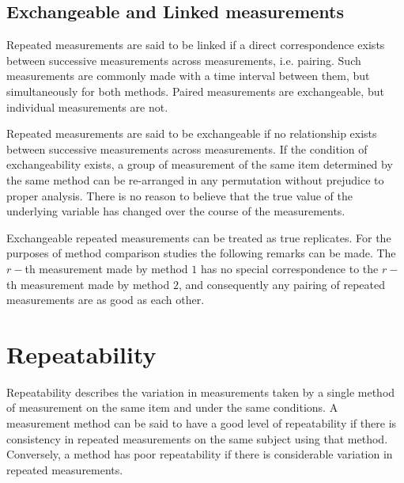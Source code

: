 \documentclass[12pt, a4paper]{report}
\theoremstyle{plain}
\theoremstyle{definition}
\theoremstyle{remark}
\begin{document}
	\subsection{Exchangeable and Linked measurements}
	
	Repeated measurements are said to be linked if a direct correspondence exists between successive measurements across measurements, i.e. pairing. Such measurements are commonly made with a time interval between them, but simultaneously for both methods. Paired measurements are exchangeable, but individual measurements are not.
	
	Repeated measurements are said to be exchangeable if no relationship exists between successive measurements across measurements. If the condition of exchangeability exists, a group of measurement of the same item determined by the same method can be re-arranged in any permutation without prejudice to proper analysis. There is no reason to believe that the true value of the underlying variable has changed over the course of the measurements.
	
	Exchangeable repeated measurements can be treated as true replicates. For the purposes of method comparison studies the following remarks can be made. The $r-$th measurement made by method $1$ has no special correspondence to the $r-$th measurement made by method $2$, and consequently any pairing of repeated measurements are as good as each other.
	
	

	
		
	
	
	
	
	

	
	
	
	\section{Repeatability}
	Repeatability describes the variation in measurements taken by a single method of measurement on the same item and under the same conditions. A measurement method can be said to have a good level of repeatability if there is consistency in repeated measurements on the same subject using that method. Conversely, a method has poor repeatability if there is considerable variation in repeated measurements.
		
\end{document}
